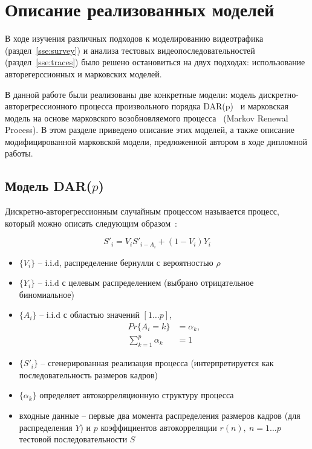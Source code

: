 \section{Описание реализованных моделей}
\label{sec:models_description}

В ходе изучения различных подходов к моделированию
видеотрафика (раздел~\ref{sse:survey}) и анализа
тестовых видеопоследовательностей (раздел~\ref{sse:traces})
было решено остановиться на двух подходах: использование
авторегерссионных и марковских моделей.

В данной работе были реализованы две конкретные модели:
модель дискретно-авторегрессионного процесса произвольного
порядка DAR(p)~\cite{heymanATM} и марковская модель на основе
марковского возобновляемого процесса~\cite{survey2013, heymanATM} (Markov Renewal Process).
В этом разделе приведено описание этих моделей, а также
описание модифицированной марковской модели, предложенной автором
в ходе дипломной работы.

\subsection{Модель DAR($p$)}
\label{sse:darp}

Дискретно-авторегрессионным случайным процессом называется
процесс, который можно описать следующим образом~\cite{survey2013}:

\begin{equation}
    S'_i = V_iS'_{i - A_i} + (1 - V_i) Y_i
    \label{eq:darp}
\end{equation}

\begin{itemize}
    \item $\{V_i\}$ -- i.i.d, распределение бернулли с вероятностью $\rho$
    \item $\{Y_i\}$ -- i.i.d с целевым распределением (выбрано отрицательное биномиальное)
    \item $\{A_i\}$ -- i.i.d с областью значений $[1\dots p]$,
        $$
        \begin{aligned}
            Pr\{A_i = k\} &= \alpha_k,\\
            \sum_{k=1}^p \alpha_k &= 1
        \end{aligned}
        $$
    \item $\{S'_i\}$ -- сгенерированная реализация процесса (интерпретируется
        как последовательность размеров кадров)
    \item $\{\alpha_k\}$ определяет автокорреляционную структуру процесса
    \item входные данные -- первые два момента распределения размеров кадров
        (для распределения $Y$) и $p$ коэффициентов автокорреляции $r(n),~n=1\dots p$
        тестовой последовательности $S$
\end{itemize}


